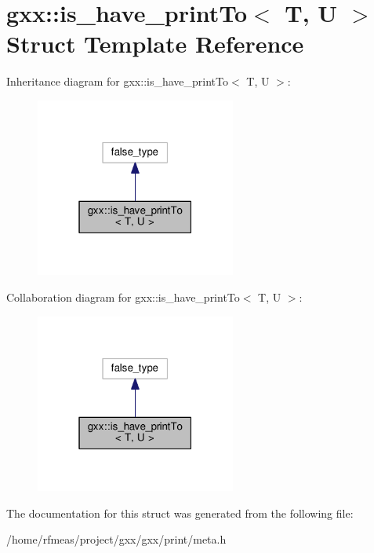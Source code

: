 \hypertarget{structgxx_1_1is__have__printTo}{}\section{gxx\+:\+:is\+\_\+have\+\_\+print\+To$<$ T, U $>$ Struct Template Reference}
\label{structgxx_1_1is__have__printTo}


Inheritance diagram for gxx\+:\+:is\+\_\+have\+\_\+print\+To$<$ T, U $>$\+:
\nopagebreak
\begin{figure}[H]
\begin{center}
\leavevmode
\includegraphics[width=187pt]{structgxx_1_1is__have__printTo__inherit__graph}
\end{center}
\end{figure}


Collaboration diagram for gxx\+:\+:is\+\_\+have\+\_\+print\+To$<$ T, U $>$\+:
\nopagebreak
\begin{figure}[H]
\begin{center}
\leavevmode
\includegraphics[width=187pt]{structgxx_1_1is__have__printTo__coll__graph}
\end{center}
\end{figure}


The documentation for this struct was generated from the following file\+:\begin{DoxyCompactItemize}
\item 
/home/rfmeas/project/gxx/gxx/print/meta.\+h\end{DoxyCompactItemize}
